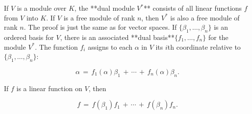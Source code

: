 If \(V\) is a module over \(K\), the **dual module \(V^{*}\)** consists of all linear functions \(f\) from \(V\) into \(K\). If \(V\) is a free module of rank \(n\), then \(V^{*}\) is also a free module of rank \(n\). The proof is just the same as for vector spaces. If \(\{\beta_{1},\ldots,\beta_{n}\}\) is an ordered basis for \(V\), there is an associated **dual basis**\(\{f_{1},\ldots,f_{n}\}\) for the module \(V^{*}\). The function \(f_{i}\) assigns to each \(\alpha\) in \(V\) its \(i\)th coordinate relative to \(\{\beta_{1},\ldots,\beta_{n}\}\):

\[\alpha\,=\,f_{1}(\alpha)\beta_{1}\,+\,\cdots\,+\,f_{n}(\alpha)\beta_{n}.\]

If \(f\) is a linear function on \(V\), then

\[f\,=\,f(\beta_{1})f_{1}\,+\,\cdots\,+\,f(\beta_{n})f_{n}.\] 